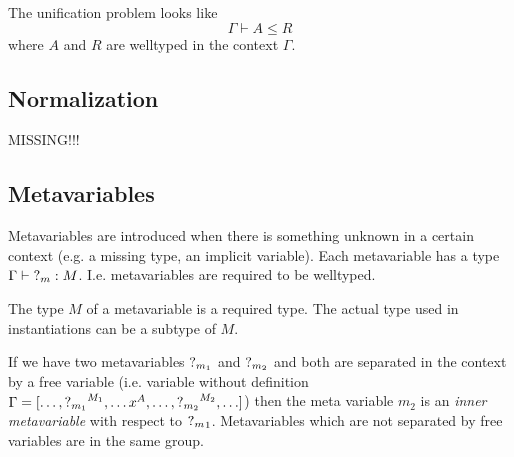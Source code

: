 The unification problem looks like
$$
\Gamma \vdash A \le R
$$
where $A$ and $R$ are welltyped in the context $\Gamma$.





\subsection{Normalization}


MISSING!!!





\subsection{Metavariables}


Metavariables are introduced when there is something unknown in a certain
context (e.g. a missing type, an implicit variable). Each metavariable has a
type $\Gamma \vdash {?_{m}} : M$. I.e. metavariables are required to be
welltyped.

The type $M$ of a metavariable is a required type. The actual type used in
instantiations can be a subtype of $M$.

If we have two metavariables ${?_{m_1}}$ and ${?_{m_2}}$ and both are separated
in the context by a free variable (i.e. variable without definition $\Gamma = [
    \ldots, {?_{m_1}}^{M_1}, \ldots x^A, \ldots, {?_{m_2}}^{M_2}, \ldots]$) then
the meta variable $m_2$ is an \emph{inner metavariable} with respect to ${?_{m}}_1$. Metavariables which are not separated by free variables are in the same
group.

